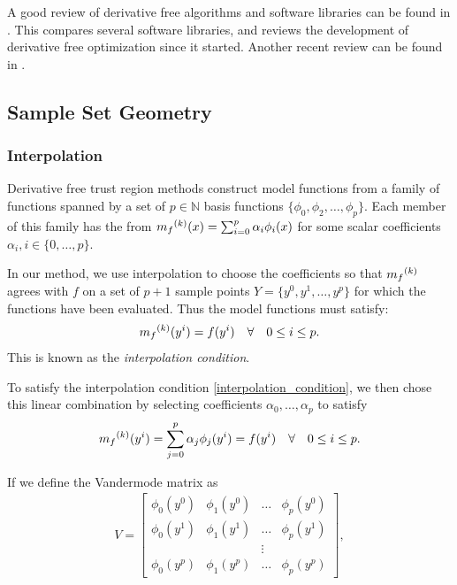 A good review of derivative free algorithms and software libraries can be found in \cite{DUMMY:review}.
This compares several software libraries, and reviews the development of derivative free optimization since it started.
Another recent review can be found in \cite{DUMMY:review2}.



\subsection{Sample Set Geometry}
\subsubsection{Interpolation}
\label{interpolation}

Derivative free trust region methods construct model functions from a family of functions spanned by a set of $p \in \mathbb N$ basis functions  $\{\phi_0, \phi_2, \ldots, \phi_p\}$.
Each member of this family has the from ${{m}_f}^{(k)}(x) = \sum_{i=0}^p\alpha_i\phi_i(x)$ for some scalar coefficients $\alpha_i, i \in \{0, \ldots, p\}$.

In our method, we use interpolation to choose the coefficients so that ${{m}_f}^{(k)}$ agrees with $f$ on a set of $p+1$ sample points $Y = \{y^0, y^1, \ldots, y^p\}$ for which the functions have been evaluated.
Thus the model functions must satisfy:
\begin{align}
\label{interpolation_condition}
{{m}_f}^{(k)}(y^i) = f(y^i) \quad \forall \quad 0 \le i \le p.
\end{align}
This is known as the \emph{interpolation condition}.

To satisfy the interpolation condition \cref{interpolation_condition}, we then chose this linear combination by selecting coefficients $\alpha_0, \ldots, \alpha_p$ to satisfy
\begin{align}
\label{interpolation_formula}
    {{m}_f}^{(k)}(y^i) = \sum^p_{j=0}\alpha_j\phi_j(y^i) = f(y^i) \quad \forall \quad 0 \le i \le p.
\end{align}

If we define the Vandermode matrix as
\begin{align}
\label{vandermonde}
V=
\begin{bmatrix}
    \phi_0(y^0)      & \phi_1(y^0)       & \ldots & \phi_{p}(y^0)      \\
    \phi_0(y^1)      & \phi_1(y^1)       & \dots  & \phi_{p}(y^1)      \\
                     &                   & \vdots &                    \\
    \phi_0(y^{p})    & \phi_1(y^{p})     & \ldots & \phi_{p}(y^{p})
\end{bmatrix},
\end{align}

